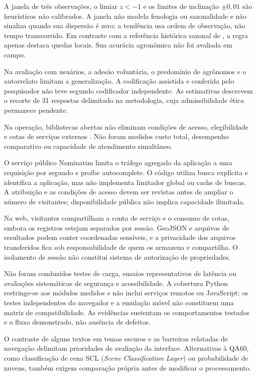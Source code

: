 A janela de três observações, o limiar $z<-1$ e os limites de inclinação $\pm0{,}01$ são heurísticos não calibrados. A janela não modela fenologia ou sazonalidade e não sinaliza quando sua dispersão é zero; a tendência usa ordem de observação, não tempo transcorrido. Em contraste com a referência histórica sazonal de \citet{MERONI2019}, a regra apenas destaca quedas locais. Sua acurácia agronômica não foi avaliada em campo.

Na avaliação com usuários, a adesão voluntária, o predomínio de agrônomos e o autorrelato limitam a generalização. A codificação assistida e conferida pelo pesquisador não teve segundo codificador independente. As estimativas descrevem o recorte de 31 respostas delimitado na metodologia, cuja admissibilidade ética permanece pendente.

Na operação, bibliotecas abertas não eliminam condições de acesso, elegibilidade e cotas de serviços externos \citep{GOOGLE_EE_NONCOMMERCIAL,NOMINATIM_POLICY}. Não foram medidos custo total, desempenho comparativo ou capacidade de atendimento simultâneo.

O serviço público Nominatim limita o tráfego agregado da aplicação a uma requisição por segundo e proíbe autocomplete. O código utiliza busca explícita e identifica a aplicação, mas não implementa limitador global ou cache de buscas. A atribuição e as condições de acesso devem ser revistas antes de ampliar o número de visitantes; disponibilidade pública não implica capacidade ilimitada.

Na web, visitantes compartilham a conta de serviço e o consumo de cotas, embora os registros estejam separados por sessão. GeoJSON e arquivos de resultados podem conter coordenadas sensíveis, e a privacidade dos arquivos transferidos fica sob responsabilidade de quem os armazena e compartilha. O isolamento de sessão não constitui sistema de autorização de propriedades.

Não foram conduzidos testes de carga, ensaios representativos de latência ou avaliações sistemáticas de segurança e acessibilidade. A cobertura Python restringe-se aos módulos medidos e não inclui serviços remotos ou JavaScript; os testes independentes do navegador e a emulação móvel não constituem uma matriz de compatibilidade. As evidências sustentam os comportamentos testados e o fluxo demonstrado, não ausência de defeitos.

O contraste de alguns textos em temas escuros e as barreiras relatadas de navegação delimitam prioridades de avaliação da interface. Alternativas à QA60, como classificação de cena SCL (\textit{Scene Classification Layer}) ou probabilidade de nuvens, também exigem comparação própria antes de modificar o processamento.
